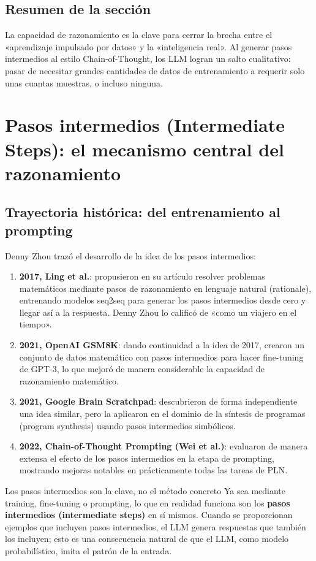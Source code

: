 \documentclass[a4paper]{article}
\begin{document}
\subsection{Resumen de la sección}

La capacidad de razonamiento es la clave para cerrar la brecha entre el «aprendizaje impulsado por datos» y la «inteligencia real». Al generar pasos intermedios al estilo Chain-of-Thought, los LLM logran un salto cualitativo: pasar de necesitar grandes cantidades de datos de entrenamiento a requerir solo unas cuantas muestras, o incluso ninguna.
\section{Pasos intermedios (Intermediate Steps): el mecanismo central del razonamiento}

\subsection{Trayectoria histórica: del entrenamiento al prompting}

Denny Zhou trazó el desarrollo de la idea de los pasos intermedios:

\begin{enumerate}
    \item \textbf{2017, Ling et al.}: propusieron en su artículo resolver problemas matemáticos mediante pasos de razonamiento en lenguaje natural (rationale), entrenando modelos seq2seq para generar los pasos intermedios desde cero y llegar así a la respuesta. Denny Zhou lo calificó de «como un viajero en el tiempo».
    \item \textbf{2021, OpenAI GSM8K}: dando continuidad a la idea de 2017, crearon un conjunto de datos matemático con pasos intermedios para hacer fine-tuning de GPT-3, lo que mejoró de manera considerable la capacidad de razonamiento matemático.
    \item \textbf{2021, Google Brain Scratchpad}: descubrieron de forma independiente una idea similar, pero la aplicaron en el dominio de la síntesis de programas (program synthesis) usando pasos intermedios simbólicos.
    \item \textbf{2022, Chain-of-Thought Prompting (Wei et al.)}: evaluaron de manera extensa el efecto de los pasos intermedios en la etapa de prompting, mostrando mejoras notables en prácticamente todas las tareas de PLN.
\end{enumerate}

\begin{importantbox}{Los pasos intermedios son la clave, no el método concreto}
Ya sea mediante training, fine-tuning o prompting, lo que en realidad funciona son los \textbf{pasos intermedios (intermediate steps)} en sí mismos. Cuando se proporcionan ejemplos que incluyen pasos intermedios, el LLM genera respuestas que también los incluyen; esto es una consecuencia natural de que el LLM, como modelo probabilístico, imita el patrón de la entrada.
\end{importantbox}
\end{document}

